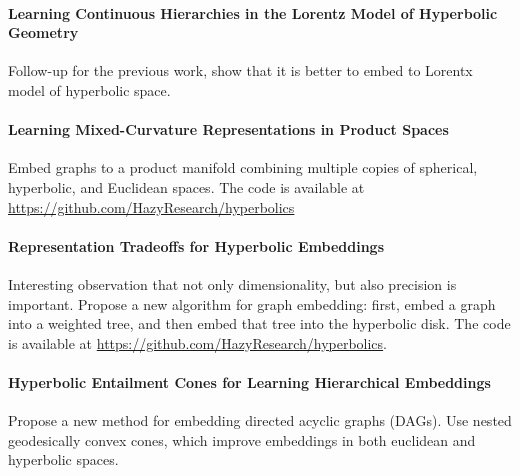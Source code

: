 \documentclass{article}
\begin{document}
\paragraph{Learning Continuous Hierarchies in the Lorentz Model of Hyperbolic Geometry~\cite{nickel2018learning}}

Follow-up for the previous work, show that it is better to embed to Lorentx model of hyperbolic space. 

\paragraph{Learning Mixed-Curvature Representations in Product Spaces~\cite{gu2019learning}}

Embed graphs to a product manifold combining multiple copies of spherical,
hyperbolic, and Euclidean spaces. The code is available at \url{https://github.com/HazyResearch/hyperbolics}

\paragraph{Representation Tradeoffs for Hyperbolic Embeddings~\cite{sala2018representation}}

Interesting observation that not only dimensionality, but also precision is important.
Propose a new algorithm for graph embedding: first, embed a graph into a weighted tree, and then embed that tree into the hyperbolic disk. The code is available at \url{https://github.com/HazyResearch/hyperbolics}.

\paragraph{Hyperbolic Entailment Cones for Learning Hierarchical Embeddings~\cite{ganea2018hyperbolic}}

Propose a new method for embedding directed acyclic graphs (DAGs). 
Use nested geodesically convex cones, which improve embeddings in both euclidean and hyperbolic spaces. 



\end{document}
